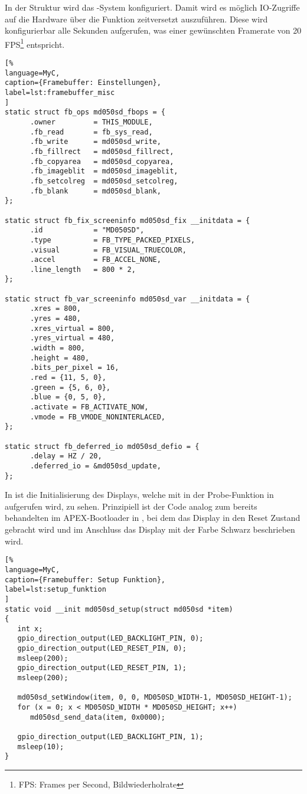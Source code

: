 In der Struktur  wird das -System konfiguriert. Damit wird es möglich IO-Zugriffe auf die Hardware über die Funktion  zeitversetzt auszuführen. Diese wird konfigurierbar alle  Sekunden aufgerufen, was einer gewünschten Framerate von 20 FPS\footnote{FPS: Frames per Second, Bildwiederholrate} entspricht. 
\begin{lstlisting}[%
language=MyC,
caption={Framebuffer: Einstellungen},
label=lst:framebuffer_misc
]
static struct fb_ops md050sd_fbops = {
      .owner         = THIS_MODULE,
      .fb_read       = fb_sys_read,
      .fb_write      = md050sd_write,
      .fb_fillrect   = md050sd_fillrect,
      .fb_copyarea   = md050sd_copyarea,
      .fb_imageblit  = md050sd_imageblit,
      .fb_setcolreg  = md050sd_setcolreg,
      .fb_blank      = md050sd_blank,
};

static struct fb_fix_screeninfo md050sd_fix __initdata = {
      .id            = "MD050SD",
      .type          = FB_TYPE_PACKED_PIXELS,
      .visual        = FB_VISUAL_TRUECOLOR,
      .accel         = FB_ACCEL_NONE,
      .line_length   = 800 * 2,
};

static struct fb_var_screeninfo md050sd_var __initdata = {
      .xres = 800,
      .yres = 480,
      .xres_virtual = 800,
      .yres_virtual = 480,
      .width = 800,
      .height = 480,
      .bits_per_pixel = 16,
      .red = {11, 5, 0},
      .green = {5, 6, 0},
      .blue = {0, 5, 0},
      .activate = FB_ACTIVATE_NOW,
      .vmode = FB_VMODE_NONINTERLACED,
};

static struct fb_deferred_io md050sd_defio = {
      .delay = HZ / 20,
      .deferred_io = &md050sd_update,
};
\end{lstlisting}

In  ist die Initialisierung des Displays, welche mit  in der Probe-Funktion in  aufgerufen wird, zu sehen. Prinzipiell ist der Code analog zum bereits behandelten im APEX-Bootloader in , bei dem das Display in den Reset Zustand gebracht wird und im Anschluss das Display mit der Farbe Schwarz beschrieben wird.

\begin{lstlisting}[%
language=MyC,
caption={Framebuffer: Setup Funktion},
label=lst:setup_funktion
]
static void __init md050sd_setup(struct md050sd *item)
{
   int x;
   gpio_direction_output(LED_BACKLIGHT_PIN, 0);
   gpio_direction_output(LED_RESET_PIN, 0);
   msleep(200);
   gpio_direction_output(LED_RESET_PIN, 1);
   msleep(200);

   md050sd_setWindow(item, 0, 0, MD050SD_WIDTH-1, MD050SD_HEIGHT-1);
   for (x = 0; x < MD050SD_WIDTH * MD050SD_HEIGHT; x++)
      md050sd_send_data(item, 0x0000);

   gpio_direction_output(LED_BACKLIGHT_PIN, 1);
   msleep(10);
}
\end{lstlisting}

